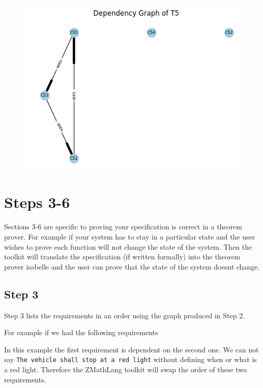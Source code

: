 \begin{figure}[H]
    \includegraphics[width=12cm]{informal/dep.png}
\end{figure}

\section{Steps 3-6}

Sections 3-6 are specific to proving your specification is correct in a theorem
prover.
For example if your system has to stay in a particular state and the user
wishes to prove each function will not change the state of the system. Then the
toolkit will translate the specification (if written formally) into the theorem
prover isabelle and the user can prove that the state of the system doesnt
change.

\subsection{Step 3}
Step 3 lists the requirements in an order using the graph produced in Step 2.

For example if we had the following requirements

\noindent{}

In this example the first requirement is dependent on the second one. We can not
say \texttt{The vehicle shall stop at a red light} without defining when or what
is a red light. Therefore the ZMathLang toolkit will swap the order of these two
requirements.

